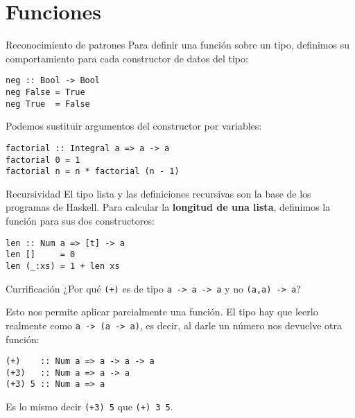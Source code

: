 \section{Funciones}

\begin{frame}[fragile]{Reconocimiento de patrones}
  Para definir una función sobre un tipo, definimos su comportamiento para cada
  constructor de datos del tipo:
  \begin{lstlisting}
neg :: Bool -> Bool
neg False = True
neg True  = False
  \end{lstlisting}

  \espacio

  Podemos sustituir argumentos del constructor por variables:
  \begin{lstlisting}
factorial :: Integral a => a -> a
factorial 0 = 1
factorial n = n * factorial (n - 1)
  \end{lstlisting}

\end{frame}

\begin{frame}[fragile]{Recursividad}
  El tipo lista y las definiciones recursivas son la base de los programas de Haskell.
  Para calcular la \textbf{longitud de una lista}, definimos la función para sus dos
  constructores:

  \espacio

  \begin{lstlisting}
len :: Num a => [t] -> a
len []     = 0
len (_:xs) = 1 + len xs
  \end{lstlisting}

\end{frame}

\begin{frame}[fragile]{Currificación}
  ¿Por qué \texttt{(+)} es de tipo \texttt{\alert{a -> a} -> a}
  y no \texttt{\alert{(a,a)} -> a}?

  \espacio

  Esto nos permite aplicar parcialmente una función. El tipo hay que leerlo realmente como
  \texttt{a -> (a -> a)}, es decir, al darle un número nos devuelve otra función:
    \begin{lstlisting}
(+)    :: Num a => a -> a -> a
(+3)   :: Num a => a -> a
(+3) 5 :: Num a => a
  \end{lstlisting}
  Es lo mismo decir \texttt{(+3) 5} que \texttt{(+) 3 5}.

\end{frame}


